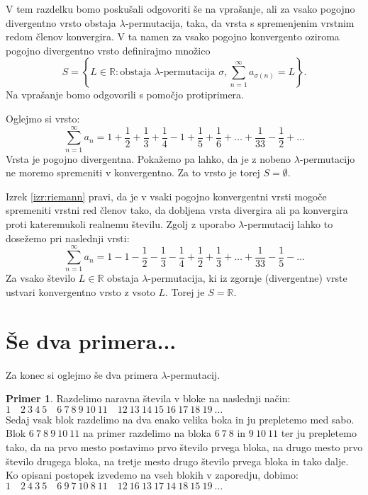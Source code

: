 \documentclass[12pt,a4paper,reqno]{amsart}
\theoremstyle{definition} %
\newtheorem{primer}[definicija]{Primer}
\theoremstyle{plain} %
\begin{document}
V tem razdelku bomo poskušali odgovoriti še na vprašanje, ali za vsako pogojno divergentno vrsto obstaja $\lambda$-permutacija, taka, da vrsta s spremenjenim vrstnim redom členov konvergira. V ta namen za vsako pogojno konvergento oziroma pogojno divergentno vrsto definirajmo množico $$S=\left \{L\in \mathbb{R}:\textrm{obstaja }\lambda \textrm{-permutacija } \sigma, \sum^{\infty}_{n=1}a_{\sigma (n)}=L\right \}.$$ Na vprašanje bomo odgovorili s pomočjo protiprimera.

Oglejmo si vrsto:
$$\sum^{\infty}_{n=1}a_n = 1+\frac{1}{2}+\frac{1}{3}+\frac{1}{4}-1+\frac{1}{5}+\frac{1}{6}+ \dots +\frac{1}{33}-\frac{1}{2}+\dots$$
Vrsta je pogojno divergentna. Pokažemo pa lahko, da je z nobeno $\lambda$-permutacijo ne moremo spremeniti v konvergentno. Za to vrsto je torej $S=\emptyset$. 

Izrek \ref{izr:riemann} pravi, da je v vsaki pogojno konvergentni vrsti mogoče spremeniti vrstni red členov tako, da dobljena vrsta divergira ali pa konvergira proti kateremukoli realnemu številu. Zgolj z uporabo $\lambda$-permutacij lahko to dosežemo pri naslednji vrsti:
$$\sum^{\infty}_{n=1}a_n= 1-1-\frac{1}{2}-\frac{1}{3}-\frac{1}{4}+\frac{1}{2}+\frac{1}{3}+\dots +\frac{1}{33}-\frac{1}{5}-\dots $$
Za vsako število $L\in \mathbb{R}$ obstaja $\lambda$-permutacija, ki iz zgornje (divergentne) vrste ustvari konvergentno vrsto z vsoto $L$. Torej je $S=\mathbb{R}$.

\section{Še dva primera...}

Za konec si oglejmo še dva primera $\lambda$-permutacij.

\begin{primer}
Razdelimo naravna števila v bloke na naslednji način:\\

$1 \quad 2\: 3\: 4\: 5 \quad 6\: 7\: 8\: 9\: 10\: 11 \quad 12\: 13\: 14\: 15\: 16\: 17\: 18\: 19\: \ldots $\\

Sedaj vsak blok razdelimo na dva enako velika boka in ju prepletemo med sabo. Blok $6\: 7\: 8\: 9\: 10\: 11$ na primer razdelimo na bloka $6\: 7\: 8$ in $9\: 10\: 11$ ter ju prepletemo tako, da na prvo mesto postavimo prvo število prvega bloka, na drugo mesto prvo število drugega bloka, na tretje mesto drugo število prvega bloka in tako dalje. Ko opisani postopek izvedemo na vseh blokih v zaporedju, dobimo:\\

$1 \quad 2\: 4\: 3\: 5 \quad 6\: 9\: 7\: 10\: 8\: 11 \quad 12\: 16\: 13\: 17\: 14\: 18\: 15\: 19\: \ldots $
\end{primer}
\end{document}
